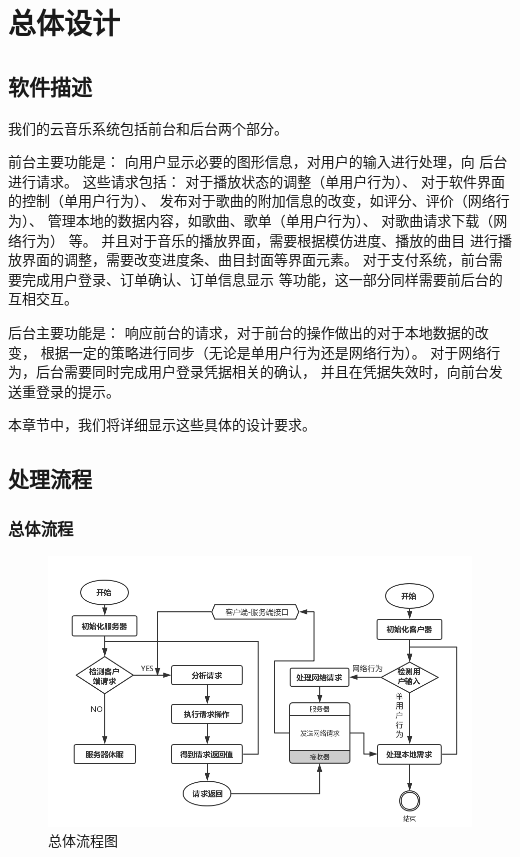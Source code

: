 \chapter{总体设计}
\section{软件描述}
我们的云音乐系统包括前台和后台两个部分。

前台主要功能是：
向用户显示必要的图形信息，对用户的输入进行处理，向
后台进行请求。
这些请求包括：
对于播放状态的调整（单用户行为）、
对于软件界面的控制（单用户行为）、
发布对于歌曲的附加信息的改变，如评分、评价（网络行为）、
管理本地的数据内容，如歌曲、歌单（单用户行为）、
对歌曲请求下载（网络行为）
等。
并且对于音乐的播放界面，需要根据模仿进度、播放的曲目
进行播放界面的调整，需要改变进度条、曲目封面等界面元素。
对于支付系统，前台需要完成用户登录、订单确认、订单信息显示
等功能，这一部分同样需要前后台的互相交互。

后台主要功能是：
响应前台的请求，对于前台的操作做出的对于本地数据的改变，
根据一定的策略进行同步（无论是单用户行为还是网络行为）。
对于网络行为，后台需要同时完成用户登录凭据相关的确认，
并且在凭据失效时，向前台发送重登录的提示。

本章节中，我们将详细显示这些具体的设计要求。

\newpage
\section{处理流程}
\subsection{总体流程}

\begin{figure}[h]
\centering
\includegraphics[width=15cm]{images/do_1}
\caption{总体流程图}
\end{figure}

